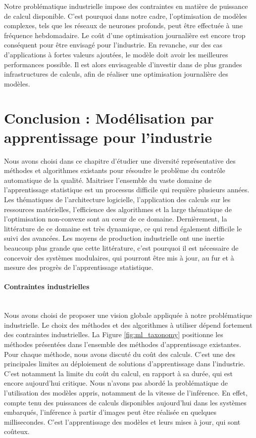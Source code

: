 Notre problématique industrielle impose des contraintes en matière de puissance de calcul disponible.
C'est pourquoi dans notre cadre, l'optimisation de modèles complexes, tels que les réseaux de neurones profonds, peut être effectuée à une fréquence hebdomadaire.
Le coût d'une optimisation journalière est encore trop conséquent pour être envisagé pour l'industrie.
En revanche, sur des cas d'applications à fortes valeurs ajoutées, le modèle doit avoir les meilleures performances possible.
Il est alors envisageable d'investir dans de plus grandes infrastructures de calculs, afin de réaliser une optimisation journalière des modèles.


\section{Conclusion : Modélisation par apprentissage pour l'industrie} \label{subsec:conclusion}
Nous avons choisi dans ce chapitre d'étudier une diversité représentative des méthodes et algorithmes existants pour résoudre le problème du contrôle automatique de la qualité.
Maitriser l'ensemble du vaste domaine de l'apprentissage statistique est un processus difficile qui requière plusieurs années.
Les thématiques de l'architecture logicielle, l'application des calculs sur les ressources matérielles, l'efficience des algorithmes et la large thématique de l'optimisation non-convexe sont au cœur de ce domaine.
Dernièrement, la littérature de ce domaine est très dynamique, ce qui rend également difficile le suivi des avancées.
Les moyens de production industrielle ont une inertie beaucoup plus grande que cette littérature, c'est pourquoi il est nécessaire de concevoir des systèmes modulaires, qui pourront être mis à jour, au fur et à mesure des progrès de l'apprentissage statistique.

\paragraph{Contraintes industrielles} \mbox{} \\
Nous avons choisi de proposer une vision globale appliquée à notre problématique industrielle.
Le choix des méthodes et des algorithmes à utiliser dépend fortement des contraintes industrielles.
La Figure \ref{fig:ml_taxonomy} positionne les méthodes présentées dans l'ensemble des méthodes d'apprentissage existantes.
Pour chaque méthode, nous avons discuté du coût des calculs.
C'est une des principales limites au déploiement de solutions d'apprentissage dans l'industrie.
C'est notamment la limite du coût du calcul, en rapport à sa durée, qui est encore aujourd'hui critique.
Nous n'avons pas abordé la problématique de l'utilisation des modèles appris, notamment de la vitesse de l'inférence.
En effet, compte tenu des puissances de calculs disponibles aujourd'hui dans les systèmes embarqués, l'inférence à partir d'images peut être réalisée en quelques millisecondes.
C'est l'apprentissage des modèles et leurs mises à jour, qui sont coûteux.

